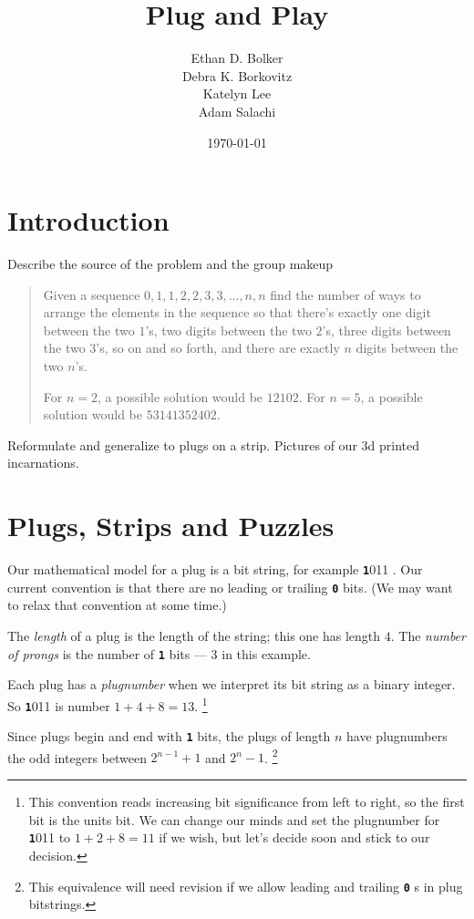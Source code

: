 \documentclass[10pt]{article}
\title{Plug and Play}
\author{
Ethan D. Bolker \\
Debra K. Borkovitz\\
  Katelyn Lee\\
  Adam Salachi
}
\date{\today}
\numberwithin{equation}{section}
\newenvironment{anote}
               {{\textcolor{blue}{Note:}}
                 \itshape
               }
               {}
\newcommand{\plug}[1]{%
\mbox{{\textbf\texttt #1}}
}
\begin{document}
\maketitle

\section{Introduction}

\begin{anote}
Describe the source of the problem and the group makeup
\end{anote}

\begin{quote}
    Given a sequence $0,1,1,2,2,3,3,...,n,n$ find the number of ways to arrange the elements in the sequence so that there's exactly one digit between the two $1$'s, two digits between the two $2$'s, three digits between the two $3$'s, so on and so forth, and there are exactly $n$ digits between the two $n$'s.

For $n=2$, a possible solution would be $12102$. For $n=5$, a possible solution would be $53141352402$.\cite{originalproblem}
\end{quote}

\begin{anote}
Reformulate and generalize to plugs on a strip. Pictures of our 3d printed incarnations.
\end{anote}
\section{Plugs, Strips and Puzzles}

Our mathematical model for a plug is a bit string, for example
\plug{1011}. Our current convention is that there are no leading or
trailing \plug{0} bits. (We may want to relax that convention at some
time.)

The \emph{length} of a plug is the length of the string; this one has
length $4$. The \emph{number of prongs} is the number of \plug{1} bits
--- $3$ in this example.

Each plug has a \emph{plugnumber} when we
interpret its bit string as a binary integer. So \plug{1011} is
number $1 + 4 + 8 = 13$.%
\footnote{This convention reads increasing bit significance from left
  to right, so the first bit is the units bit. We can change our minds
  and set the plugnumber for \plug{1011} to $1+2+8 = 11$ if we wish,
  but let's decide soon and stick to our decision.}

Since plugs begin and end with \plug{1} bits,
the plugs of length $n$ have plugnumbers the odd integers between
$2^{n-1} +1$ and $2^n -1$.
\footnote{This equivalence will need revision if we allow leading and
  trailing \plug{0}s in plug bitstrings.}
\end{document}
